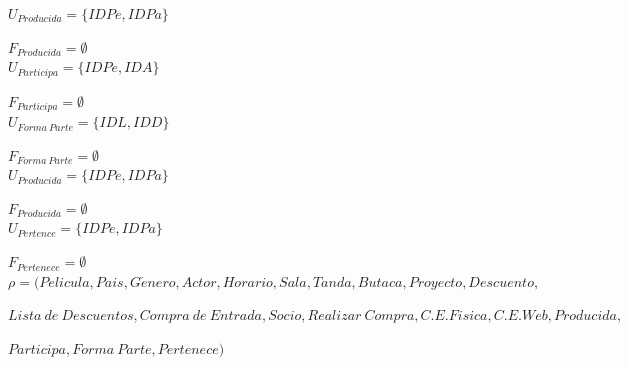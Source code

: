 	$U_{Producida}=\{IDPe,IDPa\}$
		
	$F_{Producida}=\emptyset$\\
	
	$U_{Participa}=\{IDPe,IDA\}$
		
	$F_{Participa}=\emptyset$\\
	
	$U_{Forma~Parte}=\{IDL,IDD\}$
		
	$F_{Forma~Parte}=\emptyset$\\
	
	$U_{Producida}=\{IDPe,IDPa\}$
		
	$F_{Producida}=\emptyset$\\
	
	$U_{Pertence}=\{IDPe,IDPa\}$
		
	$F_{Pertenece}=\emptyset$\\
		
	$\rho=(Pelicula,Pais,G\acute{e}nero,Actor,Horario,Sala,Tanda,Butaca,Proyecto,Descuento,$
	
	$Lista~de~Descuentos,Compra~de~Entrada,Socio,Realizar~Compra,C.E.Fisica,C.E.Web,Producida,$
	
	$Participa,Forma~Parte,Pertenece)$	